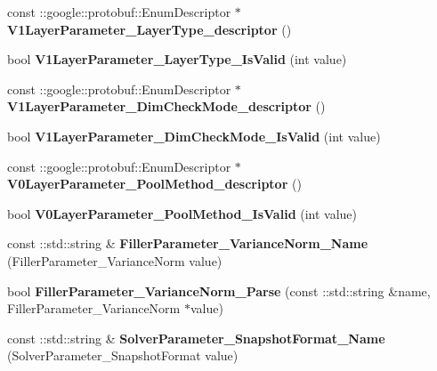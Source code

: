 \begin{DoxyCompactItemize}
\mbox{\label{namespacecaffe_ab498433316d520fe68ccbd2b5d1fb135}} 
const \+::google\+::protobuf\+::\+Enum\+Descriptor $\ast$ {\bfseries V1\+Layer\+Parameter\+\_\+\+Layer\+Type\+\_\+descriptor} ()
\item 
\mbox{\label{namespacecaffe_a1d7dc70143d1ba1a9d26522793e864cb}} 
bool {\bfseries V1\+Layer\+Parameter\+\_\+\+Layer\+Type\+\_\+\+Is\+Valid} (int value)
\item 
\mbox{\label{namespacecaffe_a2b68fba571642a04fd03e7bd253dc480}} 
const \+::google\+::protobuf\+::\+Enum\+Descriptor $\ast$ {\bfseries V1\+Layer\+Parameter\+\_\+\+Dim\+Check\+Mode\+\_\+descriptor} ()
\item 
\mbox{\label{namespacecaffe_a2cd2b916b5ebca1495419d1729c00f84}} 
bool {\bfseries V1\+Layer\+Parameter\+\_\+\+Dim\+Check\+Mode\+\_\+\+Is\+Valid} (int value)
\item 
\mbox{\label{namespacecaffe_ac2476a67a3106b18bcb51133907c581d}} 
const \+::google\+::protobuf\+::\+Enum\+Descriptor $\ast$ {\bfseries V0\+Layer\+Parameter\+\_\+\+Pool\+Method\+\_\+descriptor} ()
\item 
\mbox{\label{namespacecaffe_a708e0940819354059a861266eafaef7c}} 
bool {\bfseries V0\+Layer\+Parameter\+\_\+\+Pool\+Method\+\_\+\+Is\+Valid} (int value)
\item 
\mbox{\label{namespacecaffe_a7887d9766452e61ef12390a9920f357a}} 
const \+::std\+::string \& {\bfseries Filler\+Parameter\+\_\+\+Variance\+Norm\+\_\+\+Name} (Filler\+Parameter\+\_\+\+Variance\+Norm value)
\item 
\mbox{\label{namespacecaffe_aeb330150c88d4704b14d327540ef8919}} 
bool {\bfseries Filler\+Parameter\+\_\+\+Variance\+Norm\+\_\+\+Parse} (const \+::std\+::string \&name, Filler\+Parameter\+\_\+\+Variance\+Norm $\ast$value)
\item 
\mbox{\label{namespacecaffe_ae829601b8f89ded9502012468f5ae3ce}} 
const \+::std\+::string \& {\bfseries Solver\+Parameter\+\_\+\+Snapshot\+Format\+\_\+\+Name} (Solver\+Parameter\+\_\+\+Snapshot\+Format value)

\end{DoxyCompactItemize}

